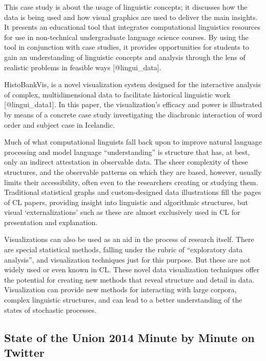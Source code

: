 \documentclass[]{book}
\theoremstyle{definition}
\theoremstyle{definition}
\theoremstyle{definition}
\theoremstyle{remark}
\begin{document}
This case study is about the usage of linguistic concepts; it discusses
how the data is being used and how visual graphics are used to deliver
the main insights. It presents an educational tool that integrates
computational linguistics resources for use in non-technical
undergraduate language science courses. By using the tool in conjunction
with case studies, it provides opportunities for students to gain an
understanding of linguistic concepts and analysis through the lens of
realistic problems in feasible ways {[}@lingui\_data{]}.

HistoBankVis, is a novel visualization system designed for the
interactive analysis of complex, multidimensional data to facilitate
historical linguistic work {[}@lingui\_data1{]}. In this paper, the
visualization's efficacy and power is illustrated by means of a concrete
case study investigating the diachronic interaction of word order and
subject case in Icelandic.

Much of what computational linguists fall back upon to improve natural
language processing and model language ``understanding'' is structure
that has, at best, only an indirect attestation in observable data. The
sheer complexity of these structures, and the observable patterns on
which they are based, however, usually limits their accessibility, often
even to the researchers creating or studying them. Traditional
statistical graphs and custom-designed data illustrations fill the pages
of CL papers, providing insight into linguistic and algorithmic
structures, but visual `externalizations' such as these are almost
exclusively used in CL for presentation and explanation.

Visualizations can also be used as an aid in the process of research
itself. There are special statistical methods, falling under the rubric
of ``exploratory data analysis'', and visualization techniques just for
this purpose. But these are not widely used or even known in CL. These
novel data visualization techniques offer the potential for creating new
methods that reveal structure and detail in data. Visualization can
provide new methods for interacting with large corpora, complex
linguistic structures, and can lead to a better understanding of the
states of stochastic processes.

\subsection{State of the Union 2014 Minute by Minute on
Twitter}\label{state-of-the-union-2014-minute-by-minute-on-twitter}
\end{document}
